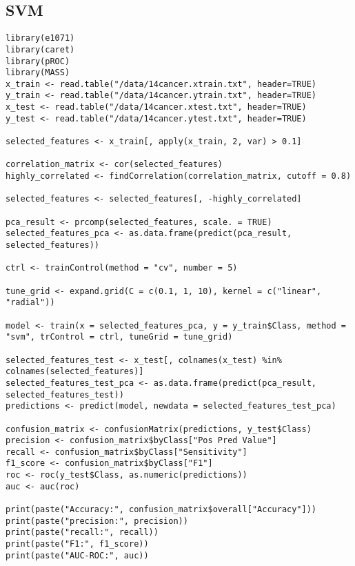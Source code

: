 \documentclass{article}
\begin{document}
\subsection{SVM}
\begin{lstlisting}
library(e1071)
library(caret)
library(pROC)
library(MASS)
x_train <- read.table("/data/14cancer.xtrain.txt", header=TRUE)
y_train <- read.table("/data/14cancer.ytrain.txt", header=TRUE)
x_test <- read.table("/data/14cancer.xtest.txt", header=TRUE)
y_test <- read.table("/data/14cancer.ytest.txt", header=TRUE)

selected_features <- x_train[, apply(x_train, 2, var) > 0.1]

correlation_matrix <- cor(selected_features)
highly_correlated <- findCorrelation(correlation_matrix, cutoff = 0.8)

selected_features <- selected_features[, -highly_correlated]

pca_result <- prcomp(selected_features, scale. = TRUE)
selected_features_pca <- as.data.frame(predict(pca_result, selected_features))

ctrl <- trainControl(method = "cv", number = 5)

tune_grid <- expand.grid(C = c(0.1, 1, 10), kernel = c("linear", "radial"))

model <- train(x = selected_features_pca, y = y_train$Class, method = "svm", trControl = ctrl, tuneGrid = tune_grid)

selected_features_test <- x_test[, colnames(x_test) %in% colnames(selected_features)]
selected_features_test_pca <- as.data.frame(predict(pca_result, selected_features_test))
predictions <- predict(model, newdata = selected_features_test_pca)

confusion_matrix <- confusionMatrix(predictions, y_test$Class)
precision <- confusion_matrix$byClass["Pos Pred Value"]
recall <- confusion_matrix$byClass["Sensitivity"]
f1_score <- confusion_matrix$byClass["F1"]
roc <- roc(y_test$Class, as.numeric(predictions))
auc <- auc(roc)

print(paste("Accuracy:", confusion_matrix$overall["Accuracy"]))
print(paste("precision:", precision))
print(paste("recall:", recall))
print(paste("F1:", f1_score))
print(paste("AUC-ROC:", auc))
\end{lstlisting}
\newpage
\end{document}
